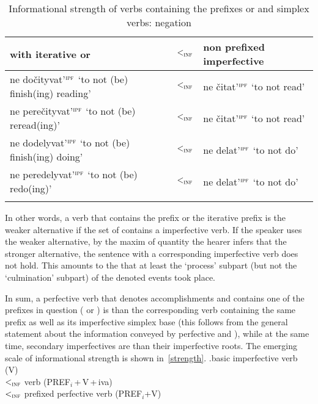 \begin{table}
\caption{Informational strength of verbs containing the prefixes  or  and simplex verbs: negation\label{table:neg}}
\begin{tabularx}{\textwidth}{Qcl}
\lsptoprule
{}  with iterative  or   & $<_{\textsc{inf}}$ & non prefixed  imperfective\\
\midrule
ne do\v{c}ityvat'$^{\textsc{ipf}}$ `to not (be) finish(ing) reading' & $<_{\textsc{inf}}$ & ne \v{c}itat'$^{\textsc{ipf}}$ `to not read'\\
ne pere\v{c}ityvat'$^{\textsc{ipf}}$ `to not (be) reread(ing)' & $<_{\textsc{inf}}$ & ne \v{c}itat'$^{\textsc{ipf}}$ `to not read'\\
ne dodelyvat'$^{\textsc{ipf}}$ `to not (be) finish(ing) doing' & $<_{\textsc{inf}}$ & ne delat'$^{\textsc{ipf}}$ `to not do'\\
ne peredelyvat'$^{\textsc{ipf}}$ `to not (be) redo(ing)' & $<_{\textsc{inf}}$ & ne delat'$^{\textsc{ipf}}$ `to not do'\\
\lspbottomrule
\end{tabularx}
\end{table}

In other words, a   verb that contains the prefix  or the iterative prefix  is the weaker alternative if the set of  contains a   imperfective verb. If the speaker uses the weaker alternative, by the maxim of quantity \citep{Grice:75} the hearer infers that the stronger alternative, the sentence with a corresponding   imperfective verb does not hold. This amounts to the  that at least the `process' subpart (but not the `culmination' subpart) of the denoted events took place.

In sum, a perfective verb that denotes accomplishments and contains one of the prefixes in question ( or ) is  than the corresponding  verb containing the same prefix as well as its imperfective simplex base (this follows from the general statement about the information conveyed by perfective and ), while at the same time, secondary imperfectives are  than their imperfective roots. The emerging scale of informational strength is shown in~\ref{strength}.
\ex.\label{strength}basic imperfective verb (V)\\
$<_{\textsc{inf}}$  verb (PREF$_i$\,+\,V\,+\,iva)\\ $<_{\textsc{inf}}$ prefixed perfective verb (PREF$_i$+V)

